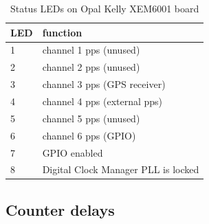 \begin{table}
\begin{center}
\begin{tabular}{ll}
LED & function \\ \hline
1 & channel 1 pps (unused)\\
2 & channel 2 pps (unused) \\
3 & channel 3 pps (GPS receiver)\\
4 & channel 4 pps (external pps)\\
5 & channel 5 pps (unused)\\
6 & channel 6 pps (GPIO)\\
7 & GPIO enabled\\
8 & Digital Clock Manager PLL is locked\\
\end{tabular}
\end{center}
\caption{Status LEDs on Opal Kelly XEM6001 board \label{t:XEM6001LEDs}}
\end{table}

\subsection{Counter delays}